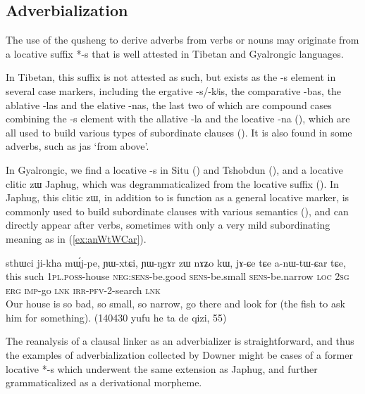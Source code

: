 \documentclass[oldfontcommands,oneside,a4paper,11pt]{article}
\newcommand{\ipa}[1]{{\phon \mbox{#1}}} %
\begin{document}
\subsection{Adverbialization}
The use of the qusheng  to derive adverbs from verbs or nouns may originate from a locative suffix *\ipa{-s} that is well attested in Tibetan and Gyalrongic languages.

In Tibetan, this suffix is not attested as such, but exists as the \ipa{-s} element in several case markers, including the ergative \ipa{-s}/\ipa{-kʲis}, the comparative \ipa{-bas}, the ablative \ipa{-las} and the elative \ipa{-nas}, the last two of which are compound cases combining the \ipa{-s} element with the allative \ipa{-la} and the locative \ipa{-na} (\citealt{hill12bas}), which are all used to build various types of subordinate clauses (\citealt{tournadre10cases}). It is also found in some adverbs, such as \ipa{jas} `from above'. 

In Gyalrongic, we find a locative \ipa{-s} in Situ (\citealt{linxr93jiarong}) and Tshobdun (\citealt[129]{jackson98morphology}), and a locative clitic \ipa{zɯ} Japhug, which was degrammaticalized from the locative suffix (\citealt[167-9]{jacques08}). In Japhug, this clitic \ipa{zɯ}, in addition to is function as a general locative marker, is commonly used to build subordinate clauses with various semantics (\citealt[275;293]{jacques14linking}), and can directly appear after verbs, sometimes with only a very mild subordinating meaning as in (\ref{ex:anWtWCar}).

\begin{exe}
\ex \label{ex:anWtWCar}
\gll \ipa{kɯki} 	\ipa{sthɯci} 	\ipa{ji-kha} 	\ipa{mɯ́j-pe,} 	\ipa{ɲɯ-xtɕi,} 	\ipa{ɲɯ-ŋgɤr} 	\ipa{zɯ} 	\ipa{nɤʑo} 	\ipa{kɯ,}  \ipa{jɤ-ɕe} 	\ipa{tɕe} 	\ipa{a-nɯ-tɯ-ɕar} 	\ipa{tɕe,}  \\
this such \textsc{1pl.poss}-house \textsc{neg:sens}-be.good  \textsc{sens}-be.small  \textsc{sens}-be.narrow \textsc{loc} \textsc{2sg} \textsc{erg} \textsc{imp}-go \textsc{lnk}  \textsc{irr-pfv}-2-search \textsc{lnk} \\
\glt Our house is so bad, so small, so narrow, go there and look for (the fish to ask him for something). (140430 yufu he ta de qizi, 55)
\end{exe}
The reanalysis of a clausal linker as an adverbializer is straightforward, and thus the examples of adverbialization collected by Downer might be cases of a former locative *\ipa{-s} which underwent the same extension as Japhug, and further grammaticalized as a derivational morpheme.
 
\end{document}

